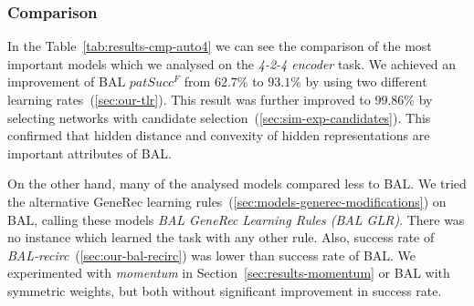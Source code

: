 
\subsubsection{Comparison} 
\label{sec:tlr-auto4-cmp} 

In the Table~\ref{tab:results-cmp-auto4} we can see the comparison of the most important models which we analysed on the \emph{4-2-4 encoder} task. We achieved an improvement of BAL $patSucc^F$ from $62.7\%$ to $93.1\%$ by using two different learning rates~(\ref{sec:our-tlr}). This result was further improved to $99.86\%$ by selecting networks with candidate selection~(\ref{sec:sim-exp-candidates}). This confirmed that hidden distance and convexity of hidden representations are important attributes of BAL. 

On the other hand, many of the analysed models compared less to BAL. We tried the alternative GeneRec learning rules~(\ref{sec:models-generec-modifications}) on BAL, calling these models \emph{BAL GeneRec Learning Rules (BAL GLR)}. There was no instance which learned the task with any other rule. Also, success rate of \emph{BAL-recirc}~(\ref{sec:our-bal-recirc}) was lower than success rate of BAL. We experimented with \emph{momentum} in Section~\ref{sec:results-momentum} or BAL with symmetric weights, but both without significant improvement in success rate.

